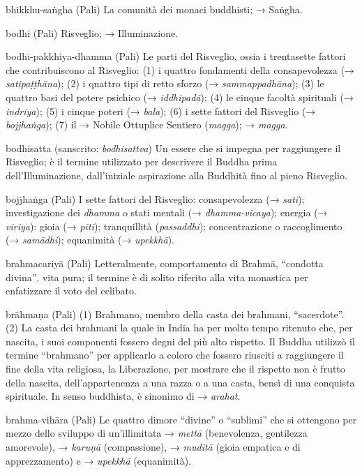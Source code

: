 \begin{glossarydescription}
\item[bhikkhu-saṅgha] (Pali) La comunità dei monaci buddhisti; → Saṅgha.

\item[bodhi] (Pali) Risveglio; → Illuminazione.

\item[bodhi-pakkhiya-dhamma] (Pali) Le parti del Risveglio, ossia i
trentasette fattori che contribuiscono al Risveglio: (1) i quattro
fondamenti della consapevolezza (→ \emph{satipaṭṭhāna}); (2) i quattro
tipi di retto sforzo (→ \emph{sammappadhāna}); (3) le quattro basi del
potere psichico (→ \emph{iddhipadā}); (4) le cinque facoltà spirituali
(→ \emph{indriya}); (5) i cinque poteri (→ \emph{bala}); (6) i sette
fattori del Risveglio (→ \emph{bojjhaṅga}); (7) il → Nobile Ottuplice
Sentiero (\emph{magga}); → \emph{magga}.

\item[bodhisatta] (sanscrito: \emph{bodhisattva}) Un essere che si
impegna per raggiungere il Risveglio; è il termine utilizzato per
descrivere il Buddha prima dell'Illuminazione, dall'iniziale aspirazione
alla Buddhità fino al pieno Risveglio.

\item[bojjhaṅga] (Pali) I sette fattori del Risveglio: consapevolezza (→
\emph{sati}); investigazione dei \emph{dhamma} o stati mentali (→
\emph{dhamma-vicaya}); energia (→ \emph{viriya}): gioia (→ \emph{pīti});
tranquillità (\emph{passaddhi}); concentrazione o raccoglimento (→
\emph{samādhi}); equanimità (→ \emph{upekkhā}).

\item[brahmacariyā] (Pali) Letteralmente, comportamento di Brahmā, ``condotta
divina'', vita pura; il termine è di solito riferito alla vita monastica
per enfatizzare il voto del celibato.

\item[brāhmaṇa] (Pali) (1) Brahmano, membro della casta dei brahmani,
``sacerdote''. (2) La casta dei brahmani la quale in India ha per molto
tempo ritenuto che, per nascita, i suoi componenti fossero degni del più
alto rispetto. Il Buddha utilizzò il termine ``brahmano'' per applicarlo
a coloro che fossero riusciti a raggiungere il fine della vita
religiosa, la Liberazione, per mostrare che il rispetto non è frutto
della nascita, dell'appartenenza a una razza o a una casta, bensì di una
conquista spirituale. In senso buddhista, è sinonimo di → \emph{arahat}.

\item[brahma-vihāra] (Pali) Le quattro dimore ``divine'' o ``sublimi'' che si
ottengono per mezzo dello sviluppo di un'illimitata → \emph{mettā}
(benevolenza, gentilezza amorevole), → \emph{karuṇā} (compassione), →
\emph{muditā} (gioia empatica e di apprezzamento) e → \emph{upekkhā}
(equanimità).


\end{glossarydescription}
